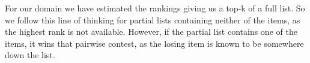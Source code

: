 For our domain we have estimated the rankings giving us a top-k of a full list. So we follow this line of thinking for partial lists containing neither of the items, as the highest rank is not available. However, if the partial list contains one of the items, it wins that pairwise contest, as the losing item is known to be somewhere down the list.



